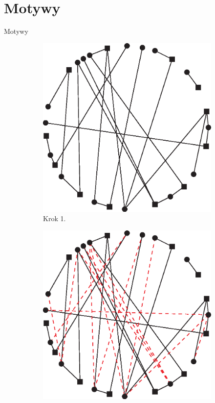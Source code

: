 \documentclass{beamer}
\begin{document}
\section{Motywy}
\begin{frame}{Motywy}
  \begin{figure}[h]
    \centering
    \begin{subfigure}[b]{0.3\textwidth}
      \includegraphics[width=\textwidth]{cs_motif_1}
      \caption{Krok 1.}
    \end{subfigure}
    \begin{subfigure}[b]{0.3\textwidth}
      \includegraphics[width=\textwidth]{cs_motif_2}

\end{subfigure}
\end{figure}
\end{frame}
\end{document}

